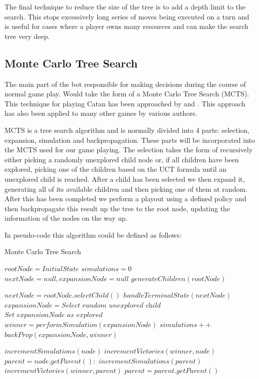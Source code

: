 \documentclass[]{article}
\begin{document}
\par The final technique to reduce the size of the tree is to add a depth limit to the search. This stops excessively long series of moves being executed on a turn and is useful for cases where a player owns many resources and can make the search tree very deep. 


\subsection{Monte Carlo Tree Search}
The main part of the bot responsible for making decisions during the course of normal game play. Would take the form of a Monte Carlo Tree Search (MCTS). This technique for playing Catan has been approached by \textcite{szita2009monte} and \textcite{roelofs2012monte}. This approach has also been applied to many other games by various authors.

\par MCTS is a tree search algorithm and is normally divided into 4 parts: selection, expansion, simulation and backpropagation. These parts will be incorporated into the MCTS used for our game playing. The selection takes the form of recursively either picking a randomly unexplored child node or, if all children have been explored, picking one of the children based on the UCT formula until an unexplored child is reached. After a child has been selected we then expand it, generating all of its available children and then picking one of them at random. After this has been completed we perform a playout using a defined policy and then backpropagate this result up the tree to the root node, updating the information of the nodes on the way up.

\par In pseudo-code this algorithm could be defined as follows: 
\begin{algorithm}
\caption{Monte Carlo Tree Search}\label{MCTS}
\begin{algorithmic}[1]
\State $rootNode = InitialState$
\State $simulations = 0$
\State $nextNode = null , expansionNode = null$
\State $generateChildren(rootNode)$

\State $nextNode = rootNode.selectChild()$
	\State $handleTerminalState(nextNode)$
\Else
	\State $expansionNode = \textit{Select random unexplored child}$
	\State $\textit{Set expansionNode as explored}$
	\State $winner = performSimulation(expansionNode)$
	\State $simulations++$
	\State $backProp(expansionNode, winner)$
\EndIf
\EndWhile
\EndProcedure

\State $incrementSimulations(node)$
\State $incrementVictories(winner,node)$
\State $parent = node.getParent():$
	\State $incrementSimulations(parent)$
	\State $incrementVictories(winner,parent)$
	\State $parent = parent.getParent()$
\EndWhile
\EndProcedure

\end{algorithmic}
\end{algorithm}
\end{document}
